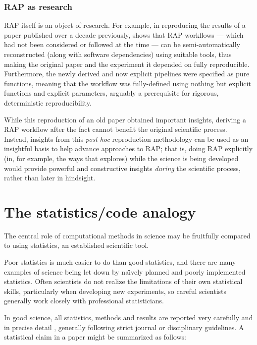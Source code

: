 \documentclass{comjnl}
\begin{document}
\subsubsection{RAP as research}
RAP itself is an object of research. For example, in reproducing the results of a paper published over a decade previously, \cite{Courtes} shows that RAP workflows --- which had not been considered or followed at the time --- can be semi-automatically reconstructed (along with software dependencies) using suitable tools, thus making the original paper and the experiment it depended on fully reproducible. Furthermore, the newly derived and now explicit pipelines were specified as pure functions, meaning that the workflow was fully-defined using nothing but explicit functions and explicit parameters, arguably a prerequisite for rigorous, deterministic reproducibility. 

While this reproduction of an old paper obtained important insights, deriving a RAP workflow after the fact cannot benefit the original scientific process. Instead, insights from this \emph{post hoc\/} reproduction methodology \cite{Courtes} can be used as an insightful basis to help advance approaches to RAP; that is, doing RAP explicitly (in, for example, the ways that \cite{Courtes} explores) while the science is being developed would provide powerful and constructive insights \emph{during\/} the scientific process, rather than later in hindsight.

\section{The statistics/code analogy}\label{statistics-computation-analogy}
The central role of computational methods in science may be fruitfully compared to using statistics, an established scientific tool. 

Poor statistics is much easier to do than good statistics, and there are many examples of science being let down by na\"\i vely planned and poorly implemented statistics. Often scientists do not realize the limitations of their own statistical skills, particularly when developing new experiments, so careful scientists generally work closely with professional statisticians. 

In good science, all statistics, methods and results are reported very carefully and in precise detail \cite{apa-statistics,Mariusz-reporting,science-statistics-recommendations}, generally following strict journal or disciplinary guidelines. A statistical claim in a paper might be summarized as follows:
\end{document}
